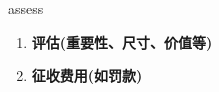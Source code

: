 
\begin{frame}
{\huge assess}
\begin{center}
\begin{enumerate}\Large
  \item \textbf{评估(重要性、尺寸、价值等)}
  \item \textbf{征收费用(如罚款)}
\end{enumerate}
\end{center}
\end{frame}
